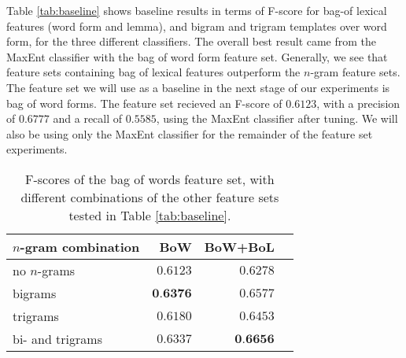 \documentclass[11pt,letterpaper]{article}
\begin{document}
Table \ref{tab:baseline} shows baseline results in terms of F-score for bag-of lexical features (word form and lemma), and bigram and trigram templates over word form, for the three different classifiers. The overall best result came from the MaxEnt classifier with the bag of word form feature set. Generally, we see that feature sets containing bag of lexical features outperform the $n$-gram feature sets. The feature set we will use as a baseline in the next stage of our experiments is bag of word forms. The feature set recieved an F-score of $0.6123$, with a precision of $0.6777$ and a recall of $0.5585$, using the MaxEnt classifier after tuning. We will also be using only the MaxEnt classifier for the remainder of the feature set experiments.

\begin{table}
  \begin{smaller}
    \begin{center}
      \begin{tabular}{lrrr}
        \toprule
      
        $n$-gram combination & BoW & BoW+BoL \\
        \midrule
        no $n$-grams & $0.6123$ & $0.6278$ \\
        bigrams & $\textbf{0.6376}$ & $0.6577$ \\
        trigrams & $0.6180$ & $0.6453$ \\
        bi- and trigrams & $0.6337$ & $\textbf{0.6656}$ \\
        \bottomrule

      \end{tabular}
    \end{center}
    \caption{F-scores of the bag of words feature set, with different
      combinations of the other feature sets tested in Table
      \ref{tab:baseline}.}
    \label{tab:ngrams}
  \end{smaller}
\end{table}
\end{document}
